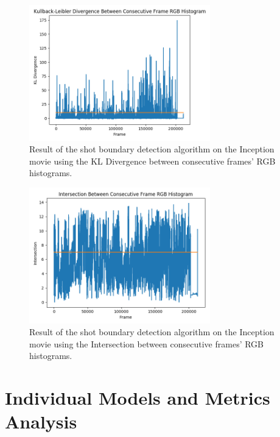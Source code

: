 \begin{figure}[h] 
\centerline{\includegraphics[width=0.70\textwidth]{figures/evaluation/inception_KLdiv_threshold10.png}}
\caption{\label{fig:inception_KLdiv_threshold10}Result of the shot boundary detection algorithm on the Inception movie using the KL Divergence between consecutive frames' RGB histograms.}
\end{figure}

\begin{figure}[h] 
\centerline{\includegraphics[width=0.70\textwidth]{figures/evaluation/inception_inter_threshold7.png}}
\caption{\label{fig:inception_inter_threshold7}Result of the shot boundary detection algorithm on the Inception movie using the Intersection between consecutive frames' RGB histograms.}
\end{figure}


\section{Individual Models and Metrics Analysis}

